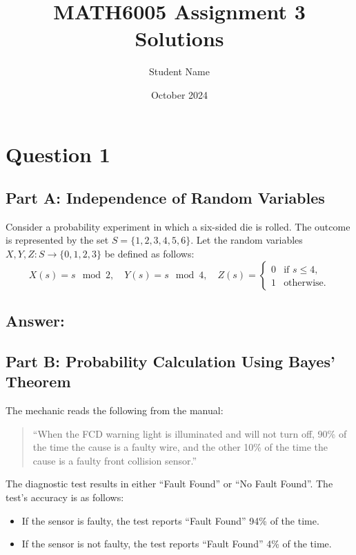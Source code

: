 \documentclass{article}
\begin{document}
	
	\title{MATH6005 Assignment 3 Solutions}
	\author{Student Name}
	\date{October 2024}
	\maketitle
	
	\section*{Question 1}
	
	\subsection*{Part A: Independence of Random Variables}
	Consider a probability experiment in which a six-sided die is rolled. The outcome is represented by the set $ S = \{1, 2, 3, 4, 5, 6\} $. Let the random variables $ X, Y, Z : S \to \{0, 1, 2, 3\} $ be defined as follows:
	\[
	X(s) = s \mod 2, \quad Y(s) = s \mod 4, \quad Z(s) = 
	\begin{cases}
		0 & \text{if } s \leq 4, \\
		1 & \text{otherwise}.
	\end{cases}
	\]
	
	\subsection*{Answer:}
	
	
	\subsection*{Part B: Probability Calculation Using Bayes' Theorem}
	The mechanic reads the following from the manual:
	\begin{quote}
		``When the FCD warning light is illuminated and will not turn off, 90\% of the time the cause is a faulty wire, and the other 10\% of the time the cause is a faulty front collision sensor.''
	\end{quote}
	
	The diagnostic test results in either ``Fault Found'' or ``No Fault Found''. The test's accuracy is as follows:
	\begin{itemize}
		\item If the sensor is faulty, the test reports ``Fault Found'' 94\% of the time.
		\item If the sensor is not faulty, the test reports ``Fault Found'' 4\% of the time.
	\end{itemize}
	
\end{document}
